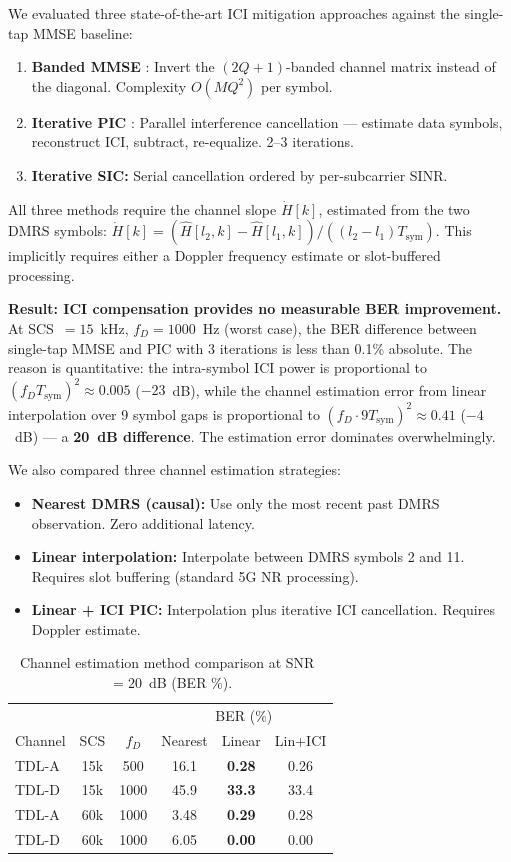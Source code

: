 \documentclass[11pt,a4paper,twoside]{article}
\newcommand{\Hest}{\hat{H}}
\begin{document}
We evaluated three state-of-the-art ICI mitigation approaches against the single-tap MMSE baseline:

\begin{enumerate}[nosep]
    \item \textbf{Banded MMSE} \cite{rugini2006}: Invert the $(2Q{+}1)$-banded channel matrix instead of the diagonal. Complexity $O(MQ^2)$ per symbol.
    \item \textbf{Iterative PIC} \cite{tomasin2005}: Parallel interference cancellation --- estimate data symbols, reconstruct ICI, subtract, re-equalize. 2--3 iterations.
    \item \textbf{Iterative SIC:} Serial cancellation ordered by per-subcarrier SINR.
\end{enumerate}

All three methods require the channel slope $\dot{H}[k]$, estimated from the two DMRS symbols: $\dot{H}[k] = (\Hest[l_2,k] - \Hest[l_1,k]) / ((l_2 - l_1) T_{\text{sym}})$. This implicitly requires either a Doppler frequency estimate or slot-buffered processing.

\textbf{Result: ICI compensation provides no measurable BER improvement.} At SCS~$= 15$~kHz, $f_D = 1000$~Hz (worst case), the BER difference between single-tap MMSE and PIC with 3 iterations is less than 0.1\% absolute. The reason is quantitative: the intra-symbol ICI power is proportional to $(f_D T_{\text{sym}})^2 \approx 0.005$ ($-23$~dB), while the channel estimation error from linear interpolation over 9 symbol gaps is proportional to $(f_D \cdot 9 T_{\text{sym}})^2 \approx 0.41$ ($-4$~dB) --- a \textbf{20~dB difference}. The estimation error dominates overwhelmingly.

We also compared three channel estimation strategies:
\begin{itemize}[nosep]
    \item \textbf{Nearest DMRS (causal):} Use only the most recent past DMRS observation. Zero additional latency.
    \item \textbf{Linear interpolation:} Interpolate between DMRS symbols 2 and 11. Requires slot buffering (standard 5G NR processing).
    \item \textbf{Linear + ICI PIC:} Interpolation plus iterative ICI cancellation. Requires Doppler estimate.
\end{itemize}

\begin{table}[H]
\centering
\caption{Channel estimation method comparison at SNR~$= 20$~dB (BER \%).}
\label{tab:ici}
\small
\begin{tabular}{lcc|ccc}
\toprule
& & & \multicolumn{3}{c}{BER (\%)} \\
Channel & SCS & $f_D$ & Nearest & Linear & Lin+ICI \\
\midrule
TDL-A & 15k & 500 & 16.1 & \textbf{0.28} & 0.26 \\
TDL-D & 15k & 1000 & 45.9 & \textbf{33.3} & 33.4 \\
TDL-A & 60k & 1000 & 3.48 & \textbf{0.29} & 0.28 \\
TDL-D & 60k & 1000 & 6.05 & \textbf{0.00} & 0.00 \\
\bottomrule
\end{tabular}
\end{table}
\end{document}
